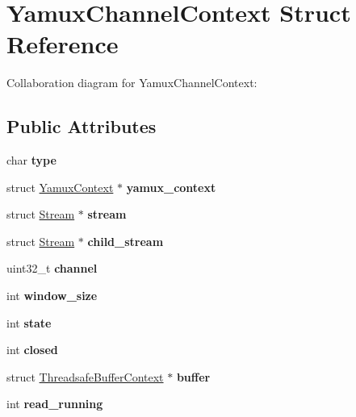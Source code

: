 \hypertarget{struct_yamux_channel_context}{}\section{Yamux\+Channel\+Context Struct Reference}
\label{struct_yamux_channel_context}


Collaboration diagram for Yamux\+Channel\+Context\+:
\subsection*{Public Attributes}
\begin{DoxyCompactItemize}
\item 
\mbox{\label{struct_yamux_channel_context_ab2f5424c6779951c2be14d3f2ef23591}} 
char {\bfseries type}
\item 
\mbox{\label{struct_yamux_channel_context_ae4d2e37871b4c76782756b67c495a552}} 
struct \mbox{\hyperlink{struct_yamux_context}{Yamux\+Context}} $\ast$ {\bfseries yamux\+\_\+context}
\item 
\mbox{\label{struct_yamux_channel_context_a1af6b32ea138c2643274a909bc54bb4f}} 
struct \mbox{\hyperlink{struct_stream}{Stream}} $\ast$ {\bfseries stream}
\item 
\mbox{\label{struct_yamux_channel_context_ac35bd6b56bd42859d57e78d37292b3b6}} 
struct \mbox{\hyperlink{struct_stream}{Stream}} $\ast$ {\bfseries child\+\_\+stream}
\item 
\mbox{\label{struct_yamux_channel_context_ac155dcbf20f517b956818bc2ff425cfb}} 
uint32\+\_\+t {\bfseries channel}
\item 
\mbox{\label{struct_yamux_channel_context_ad1cab5239b95ae6d5117f1efbe52b1b6}} 
int {\bfseries window\+\_\+size}
\item 
\mbox{\label{struct_yamux_channel_context_a52f48a799fcfe8e0d1b6263de07eeb72}} 
int {\bfseries state}
\item 
\mbox{\label{struct_yamux_channel_context_a5aa03b497dff9faf40344b2fda51209e}} 
int {\bfseries closed}
\item 
\mbox{\label{struct_yamux_channel_context_ad4760c5785c5bcda4337c5a3372f21ce}} 
struct \mbox{\hyperlink{struct_threadsafe_buffer_context}{Threadsafe\+Buffer\+Context}} $\ast$ {\bfseries buffer}
\item 
\mbox{\label{struct_yamux_channel_context_a82552def03736cb206b2a7584fde5530}} 
int {\bfseries read\+\_\+running}
\end{DoxyCompactItemize}


